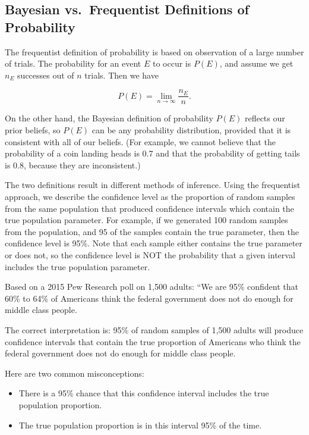 \documentclass[]{book}
\theoremstyle{definition}
\theoremstyle{definition}
\theoremstyle{definition}
\theoremstyle{remark}
\let\BeginKnitrBlock\begin \let\EndKnitrBlock\end
\begin{document}
\subsection{Bayesian vs.~Frequentist Definitions of
Probability}\label{bayesian-vs.frequentist-definitions-of-probability}

The frequentist definition of probability is based on observation of a
large number of trials. The probability for an event \(E\) to occur is
\(P(E)\), and assume we get \(n_E\) successes out of \(n\) trials. Then
we have

\begin{equation}
P(E) = \lim_{n \rightarrow \infty} \dfrac{n_E}{n}.
\end{equation}

On the other hand, the Bayesian definition of probability \(P(E)\)
reflects our prior beliefs, so \(P(E)\) can be any probability
distribution, provided that it is consistent with all of our beliefs.
(For example, we cannot believe that the probability of a coin landing
heads is 0.7 and that the probability of getting tails is 0.8, because
they are inconsistent.)

The two definitions result in different methods of inference. Using the
frequentist approach, we describe the confidence level as the proportion
of random samples from the same population that produced confidence
intervals which contain the true population parameter. For example, if
we generated 100 random samples from the population, and 95 of the
samples contain the true parameter, then the confidence level is 95\%.
Note that each sample either contains the true parameter or does not, so
the confidence level is NOT the probability that a given interval
includes the true population parameter.

\BeginKnitrBlock{example}
\protect\hypertarget{exm:unnamed-chunk-7}{}{\label{exm:unnamed-chunk-7}
}Based on a 2015 Pew Research poll on 1,500 adults: ``We are 95\%
confident that 60\% to 64\% of Americans think the federal government
does not do enough for middle class people.
\EndKnitrBlock{example}

The correct interpretation is: 95\% of random samples of 1,500 adults
will produce confidence intervals that contain the true proportion of
Americans who think the federal government does not do enough for middle
class people.

Here are two common misconceptions:

\begin{itemize}
\item
  There is a 95\% chance that this confidence interval includes the true
  population proportion.
\item
  The true population proportion is in this interval 95\% of the time.
\end{itemize}
\end{document}
